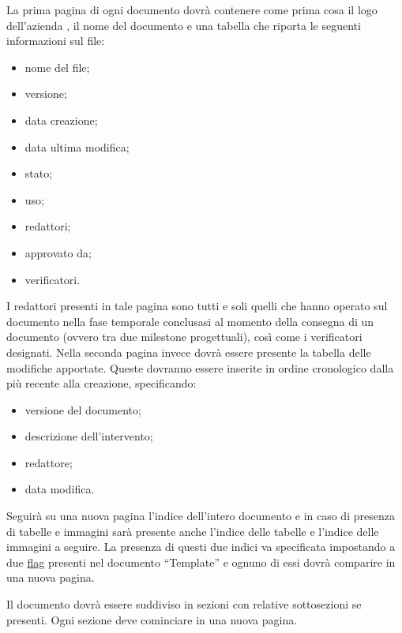 La prima pagina di ogni documento dovrà contenere come prima cosa il logo dell'azienda \team{}, il nome del documento e una tabella che riporta le seguenti informazioni sul file:
\begin{itemize}
\item nome del file;
\item versione;
\item data creazione;
\item data ultima modifica;
\item stato;
\item uso;
\item redattori;
\item approvato da;
\item verificatori.
\end{itemize}

I redattori presenti in tale pagina sono tutti e soli quelli che hanno operato sul documento nella fase temporale conclusasi al momento della consegna di un documento (ovvero tra due milestone progettuali), così come i verificatori designati. 
Nella seconda pagina invece dovrà essere presente la tabella delle modifiche apportate. Queste dovranno essere inserite in ordine cronologico dalla più recente alla creazione, specificando:
\begin{itemize}
\item versione del documento;
\item descrizione dell'intervento;
\item redattore;
\item data modifica.
\end{itemize}

Seguirà su una nuova pagina l'indice dell'intero documento e in caso di presenza di tabelle e immagini sarà presente anche l'indice delle tabelle e l'indice delle immagini a seguire. La presenza di questi due indici va specificata impostando a  due \underline{flag} presenti nel documento ``Template'' e ognuno di essi dovrà comparire in una nuova pagina.

Il documento dovrà essere suddiviso in sezioni con relative sottosezioni se presenti. Ogni sezione deve cominciare in una nuova pagina.

